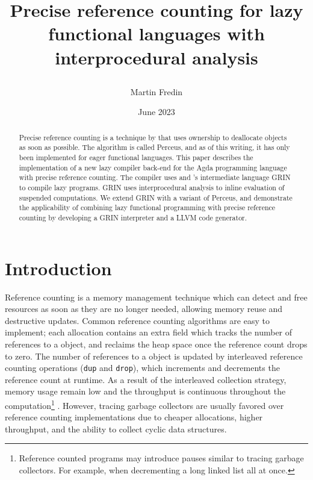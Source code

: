 \documentclass{article}
\title{
Precise reference counting for lazy functional languages with interprocedural analysis 

}
\author{Martin Fredin}
\date{June 2023}
\begin{document}
\maketitle

\begin{code}[hide]
\end{code}

\begin{abstract}

Precise reference counting is a technique by \citeauthor{reinking2021} that uses ownership to deallocate objects as soon as possible. 
The algorithm is called Perceus, and as of this writing, it has only been implemented for eager functional languages.
This paper describes the implementation of a new lazy compiler back-end for the Agda programming language with 
precise reference counting. 
The compiler uses \citeauthor{boquist1999} and \citeauthor{johnsson1991}'s intermediate language GRIN to compile lazy programs. 
GRIN uses interprocedural analysis to inline evaluation of suspended computations.
We extend GRIN with a variant of Perceus, and demonstrate the applicability of combining lazy functional programming with precise reference counting by developing a GRIN interpreter and a LLVM code generator. 
\end{abstract}

\section{Introduction}

Reference counting \citep{collins1960} is a memory management technique which can detect and free resources as soon as they are no longer needed, allowing memory reuse and destructive updates. 
Common reference counting algorithms are easy to implement; each allocation contains an extra field which tracks the number of references to a object, and reclaims the heap space once the reference count drops to zero.
The number of references to a object is updated by interleaved reference counting operations (\texttt{dup} and \texttt{drop}), which increments and decrements the reference count at runtime. 
As a result of the interleaved collection strategy, memory usage remain low and the throughput is continuous throughout the computation\footnote{Reference counted programs may introduce pauses similar to tracing garbage collectors. For example, when decrementing a long linked list all at once.} \citep{jones1996}.
However, tracing garbage collectors are usually favored over reference counting implementations due to cheaper allocations, higher throughput, and the ability to collect cyclic data structures.
\end{document}
